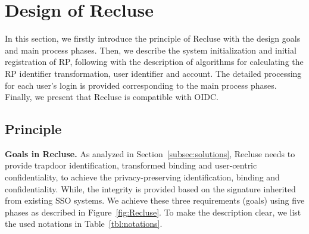 \section{Design of Recluse}
\label{sec:Recluse}
In this section, we firstly introduce the principle of Recluse with the design goals and main process phases.
Then, we describe the system initialization and initial registration of RP, following with the description of algorithms for calculating the RP identifier transformation, user identifier and account.
The detailed processing for each user's login is provided corresponding to the main process phases.
Finally, we present that Recluse is compatible with OIDC.

\subsection{Principle}
\label{subsec:overview}
\noindent\textbf{Goals in Recluse.}
As analyzed in Section~\ref{subsec:solutions}, Recluse needs to provide trapdoor identification, transformed binding and user-centric confidentiality,
to achieve the privacy-preserving identification, binding and confidentiality.
While, the integrity is provided based on the signature inherited from existing SSO systems.
We %
achieve these three requirements (goals) using five phases as described in Figure~\ref{fig:Recluse}.
To make the description clear, we list the used notations  in Table~\ref{tbl:notations}.
